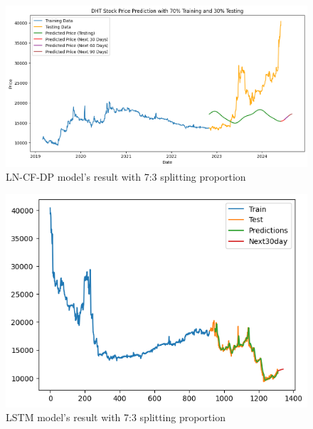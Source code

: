\documentclass{ieeeojies}
\begin{document}
\begin{figure}[H]
  \centering
  \begin{minipage}{0.8\linewidth}
    \centering
    \includegraphics[width=\linewidth]{bibliography/Figure/DHT_LN_CF&DP.png}
    \caption{LN-CF-DP model's result with 7:3 splitting proportion}
    \label{fig8}
  \end{minipage}
\end{figure}

\begin{figure}[H]
  \centering
  \begin{minipage}{0.8\linewidth}
    \centering
    \includegraphics[width=\linewidth]{bibliography/Figure/LSTM_DHT(7_3).png}
    \caption{LSTM model's result with 7:3 splitting proportion}
    \label{fig8}
  \end{minipage}
\end{figure}
\end{document}
